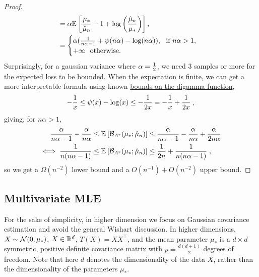 \begin{subappendices}
\begin{proof}
\begin{align}
	&= \alpha \mathbb{E}_{} \left[ \frac{\mu_*}{ \hat \mu_n} - 1 + \log \left(\frac{\hat \mu_n}{\mu_*} \right)  \right] ,
	\\
	& =
	\begin{cases}
		\alpha ( \frac{1}{n\alpha - 1} + \psi(n \alpha) - \log(n \alpha) ), \ \text{ if } n\alpha>1, \\
			+\infty \  \text{ otherwise. }
	\end{cases}
	\end{align}
	Surprisingly, for a gaussian variance where $\alpha = \frac{1}{2}$, we need $3$ samples or more for the expected loss to be bounded.
	When the expectation is finite, we can get a more interpretable formula using known \href{https://en.wikipedia.org/wiki/Digamma_function#Inequalities}{bounds on the digamma function},
	\begin{align}
		-\frac{1}{x} \leq \psi(x) - \log(x) \leq -\frac{1}{2x} = - \frac{1}{x} + \frac{1}{2x}	\; ,
	\end{align}
	giving, for $n \alpha >1 $,
	\begin{align}
		\frac{\alpha}{n\alpha-1} - \frac{\alpha}{n\alpha}
		&\leq \mathbb{E}_{} \left[ {\mathcal B}_{A^*}( \mu_*; \hat \mu_n)  \right] 
		\leq \frac{\alpha}{n\alpha-1} - \frac{\alpha}{n\alpha} + \frac{\alpha}{2n\alpha}
		\\
		\iff
			\frac{1}{n(n \alpha-1)}
			&\leq \mathbb{E}_{} \left[ {\mathcal B}_{A^*}( \mu_*; \hat \mu_n)  \right] 
			\leq \frac{1}{2n} + \frac{1}{n(n \alpha-1)} \; ,
	\end{align}
	so we get a $\Omega(n^{-2})$ lower bound and a $O(n^{-1}) + O(n^{-2})$ upper bound.
	\end{proof}


\subsection{Multivariate MLE}
\label{app:multivariateMLE}

For the sake of simplicity, in higher dimension we focus on Gaussian covariance estimation and avoid the general Wishart discussion. 
In higher dimensions, $X \sim {\mathcal N}(0, \mu_*)$, $X\in\mathbb{R}^d$, $T(X) = XX^\top$, and the mean parameter $\mu_*$ 
is a $d \times d$ symmetric, positive definite covariance matrix with $p = \frac{d(d+1)}{2}$ degrees of freedom.
Note that here $d$ denotes the dimensionality of the data $X$, rather than the dimensionality of the parameters $\mu_*$.


\end{subappendices}
